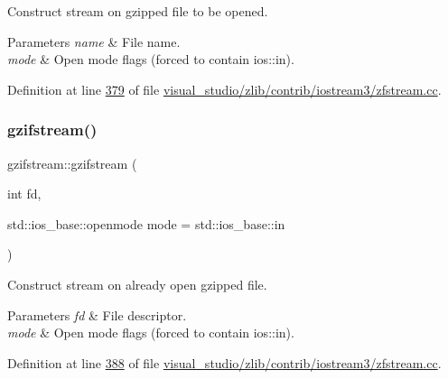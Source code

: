 Construct stream on gzipped file to be opened. 


\begin{DoxyParams}{Parameters}
{\em name} & File name. \\
\hline
{\em mode} & Open mode flags (forced to contain ios\+::in). \\
\hline
\end{DoxyParams}


Definition at line \hyperlink{visual__studio_2zlib_2contrib_2iostream3_2zfstream_8cc_source_l00379}{379} of file \hyperlink{visual__studio_2zlib_2contrib_2iostream3_2zfstream_8cc_source}{visual\+\_\+studio/zlib/contrib/iostream3/zfstream.\+cc}.

\mbox{\label{classgzifstream_aa5ab9dcc3ab35bffe781f4c49239826e}} 
\subsubsection{\texorpdfstring{gzifstream()}{gzifstream()}\hspace{0.1cm}{\footnotesize\ttfamily [2/4]}}
{\footnotesize\ttfamily gzifstream\+::gzifstream (\begin{DoxyParamCaption}\item[{int}]{fd,  }\item[{std\+::ios\+\_\+base\+::openmode}]{mode = {\ttfamily std\+:\+:ios\+\_\+base\+:\+:in} }\end{DoxyParamCaption})\hspace{0.3cm}{\ttfamily [explicit]}}



Construct stream on already open gzipped file. 


\begin{DoxyParams}{Parameters}
{\em fd} & File descriptor. \\
\hline
{\em mode} & Open mode flags (forced to contain ios\+::in). \\
\hline
\end{DoxyParams}


Definition at line \hyperlink{visual__studio_2zlib_2contrib_2iostream3_2zfstream_8cc_source_l00388}{388} of file \hyperlink{visual__studio_2zlib_2contrib_2iostream3_2zfstream_8cc_source}{visual\+\_\+studio/zlib/contrib/iostream3/zfstream.\+cc}.

\mbox{\label{classgzifstream_a90f6e0eea83b7ce3c64f755b51b5b011}} 
